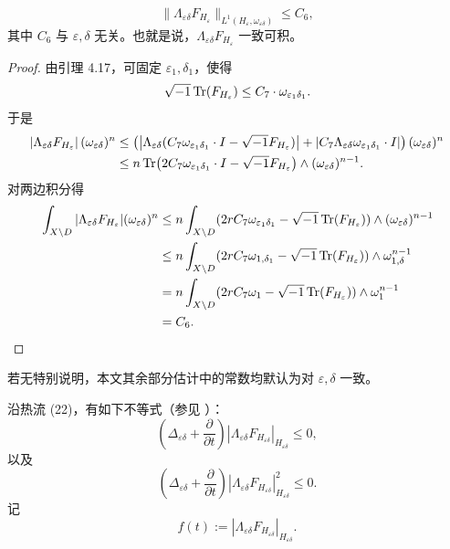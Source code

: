 \begin{lemma}
\[
\|\Lambda_{\varepsilon\delta} F_{H_{\varepsilon}}\|_{L^1(H_{\varepsilon},\omega_{\varepsilon\delta})}\le C_6,
\]
其中 \(C_6\) 与 \(\varepsilon,\delta\) 无关。也就是说，\(\Lambda_{\varepsilon\delta} F_{H_{\varepsilon}}\) 一致可积。
\end{lemma}

\begin{proof}
由引理 4.17，可固定 \(\varepsilon_1,\delta_1\)，使得
\[
\sqrt{-1}\operatorname{Tr}(F_{H_{\varepsilon}})\le C_7\cdot \omega_{\varepsilon_1\delta_1}.
\]
于是
\begin{align*}
|\Lambda_{\varepsilon\delta} F_{H_{\varepsilon}}|\,(\omega_{\varepsilon\delta})^n
&\le
\left(
\bigl|\Lambda_{\varepsilon\delta}(C_7\omega_{\varepsilon_1\delta_1}\cdot I-\sqrt{-1}F_{H_{\varepsilon}})\bigr|
+
|C_7\Lambda_{\varepsilon\delta} \omega_{\varepsilon_1\delta_1}\cdot I|
\right)
(\omega_{\varepsilon\delta})^n
\\
&\le
n\operatorname{Tr}\bigl(2C_7\omega_{\varepsilon_1\delta_1}\cdot I-\sqrt{-1}F_{H_{\varepsilon}}\bigr)\wedge (\omega_{\varepsilon\delta})^{n-1}.
\end{align*}
对两边积分得
\begin{align*}
\int_{X\setminus D}
|\Lambda_{\varepsilon\delta} F_{H_{\varepsilon}}|(\omega_{\varepsilon\delta})^n
&\le
n\int_{X\setminus D}
(2rC_7\omega_{\varepsilon_1\delta_1}-\sqrt{-1}\operatorname{Tr}(F_{H_{\varepsilon}}))\wedge (\omega_{\varepsilon\delta})^{n-1}
\\
&\le
n\int_{X\setminus D}
(2rC_7\omega_{1,\delta_1}-\sqrt{-1}\operatorname{Tr}(F_{H_{\varepsilon}}))\wedge \omega_{1,\delta}^{n-1}
\\
&=
n\int_{X\setminus D}
(2rC_7\omega_1-\sqrt{-1}\operatorname{Tr}(F_{H_{\varepsilon}}))\wedge \omega_1^{n-1}
\\
&=C_6.
\end{align*}
\end{proof}

若无特别说明，本文其余部分估计中的常数均默认为对 \(\varepsilon,\delta\) 一致。

沿热流 (22)，有如下不等式（参见 \cite{Do1}）：
\[
\left(\Delta_{\varepsilon\delta}+\frac{\partial}{\partial t}\right)
|\Lambda_{\varepsilon\delta} F_{H_{\varepsilon\delta}}|_{H_{\varepsilon\delta}}
\le 0,
\]
以及
\[
\left(\Delta_{\varepsilon\delta}+\frac{\partial}{\partial t}\right)
|\Lambda_{\varepsilon\delta} F_{H_{\varepsilon\delta}}|_{H_{\varepsilon\delta}}^2
\le 0.
\]
记
\[
f(t):=|\Lambda_{\varepsilon\delta} F_{H_{\varepsilon\delta}}|_{H_{\varepsilon\delta}}.
\]

